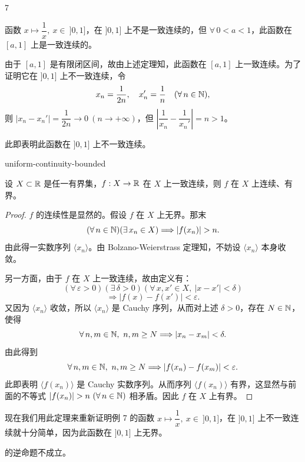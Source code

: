 \begin{sourceexample}{7}

	函数 \(x\longmapsto\dfrac1x,\ x\in\ ]0,1]\)，在 \(]0,1]\) 上不是一致连续的，但 \(\forall\,0<a<1\)，此函数在 \([a,1]\) 上是一致连续的。

	由于 \([a,1]\) 是有限闭区间，故由上述定理知，此函数在 \([a,1]\) 上一致连续。为了证明它在 \(]0,1]\) 上不一致连续，令
	\[
	x_n=\frac1{2n},\quad x_n'=\frac1n\quad(\forall\,n\in\mathbb{N}),
	\]
	则 \(|x_n-x_n'|=\dfrac1{2n}\to0\ (n\to+\infty)\)，但 \(\left|\dfrac1{x_n}-\dfrac1{x_n'}\right|=n>1\)。

	此即表明此函数在 \(]0,1]\) 上不一致连续。

\end{sourceexample}

\begin{mythm}{}{uniform-continuity-bounded}

	设 \(X\subset\mathbb{R}\) 是任一有界集，\(f:X\to\mathbb{R}\) 在 \(X\) 上一致连续，则 \(f\) 在 \(X\) 上连续、有界。

\end{mythm}

\begin{proof}

	\(f\) 的连续性是显然的。假设 \(f\) 在 \(X\) 上无界。那末
	\[
	(\forall\,n\in\N)(\exists\,x_n\in X)\Longrightarrow|f(x_n)|>n.
	\]
	由此得一实数序列 \(\langle x_n\rangle\)。由 Bolzano-Weierstrass 定理知，不妨设 \(\langle x_n\rangle\) 本身收敛。

	另一方面，由于 \(f\) 在 \(X\) 上一致连续，故由定义有：
	\[
	(\forall\,\varepsilon>0)(\exists\,\delta>0)(\forall\,x,x'\in X,\ |x-x'|<\delta)
	\]
	\[
	\Longrightarrow|f(x)-f(x')|<\varepsilon.
	\]
	又因为 \(\langle x_n\rangle\) 收敛，所以 \(\langle x_n\rangle\) 是 Cauchy 序列，从而对上述 \(\delta>0\)，存在 \(N\in\mathbb{N}\)，使得
	\[
	\forall\,n,m\in\mathbb{N},\ n,m\ge N\Longrightarrow|x_n-x_m|<\delta.
	\]
	由此得到
	\[
	\forall\,n,m\in\mathbb{N},\ n,m\ge N\Longrightarrow|f(x_n)-f(x_m)|<\varepsilon.
	\]
	此即表明 \(\langle f(x_n)\rangle\) 是 Cauchy 实数序列。从而序列 \(\langle f(x_n)\rangle\) 有界，这显然与前面的不等式 \(|f(x_n)|>n\ (\forall\,n\in\N)\) 相矛盾。因此 \(f\) 在 \(X\) 上有界。

\end{proof}

现在我们用此定理来重新证明例 7 的函数 \(x\longmapsto\dfrac1x,\ x\in\ ]0,1]\)，在 \(]0,1]\) 上不一致连续就十分简单，因为此函数在 \(]0,1]\) 上无界。

的逆命题不成立。

